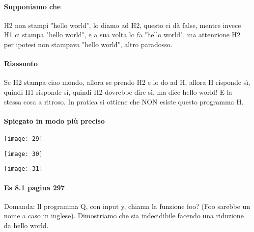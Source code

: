 \documentclass[12pt, a4paper, openany, oneside]{book}
\begin{document}
	\paragraph{Supponiamo che} H2 non stampi "hello world", lo diamo ad H2, questo 
	ci dà false, mentre invece H1 ci stampa "hello world", e a sua volta lo fa 
	"hello world", ma attenzione H2 per ipotesi non stampava "hello world", altro
	paradosso.
	\paragraph{Riassunto}
	Se H2 stampa ciao mondo, allora se prendo H2 e lo do ad H, allora H risponde sì,
	quindi H1 risponde sì, quindi H2 dovrebbe dire sì, ma dice hello world! E la
	stessa cosa a ritroso. In pratica si ottiene che NON esiste questo programma H.
	\paragraph{Spiegato in modo più preciso}
	\begin{center}
	\texttt{[image: 29]}
	\end{center}
	\begin{center}
	\texttt{[image: 30]}
	\end{center}
	\begin{center}
	\texttt{[image: 31]}
	\end{center}
	\paragraph{Es 8.1 pagina 297}
	Domanda: Il programma Q, con input y, chiama la funzione foo? (Foo sarebbe un 
	nome a caso in inglese). Dimostriamo che sia indecidibile facendo una riduzione
	da hello world.
\end{document}
